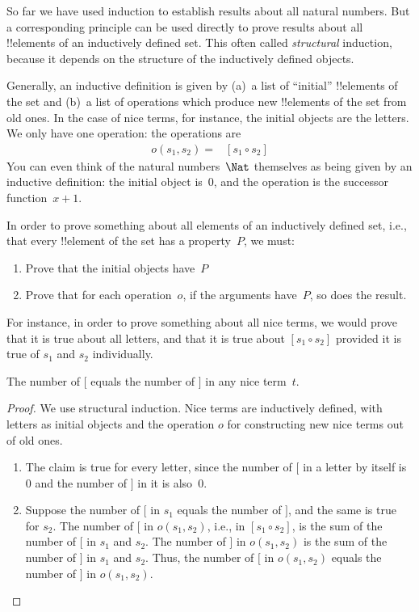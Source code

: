 \documentclass[../../../include/open-logic-section]{subfiles}
\begin{document}


So far we have used induction to establish results about all natural
numbers. But a corresponding principle can be used directly to prove
results about all !!{element}s of an inductively defined set.  This
often called \emph{structural} induction, because it depends on the
structure of the inductively defined objects.

Generally, an inductive definition is given by (a)~a list of
``initial'' !!{element}s of the set and (b)~a list of operations which
produce new !!{element}s of the set from old ones. In the case of nice
terms, for instance, the initial objects are the letters. We only have
one operation: the operations are
\begin{align*}
  o(s_1, s_2) = & [s_1 \circ s_2]
\end{align*}
You can even think of the natural numbers~$\Nat$ themselves as being
given by an inductive definition: the initial object is~$0$, and the
operation is the successor function~$x + 1$.

In order to prove something about all elements of an inductively
defined set, i.e., that every !!{element} of the set has a
property~$P$, we must:
\begin{enumerate}
\item Prove that the initial objects have~$P$
\item Prove that for each operation~$o$, if the arguments have~$P$,
  so does the result.
\end{enumerate}
For instance, in order to prove something about all nice terms, we
would prove that it is true about all letters, and that it is true
about $[s_1 \circ s_2]$ provided it is true of $s_1$ and $s_2$
individually.

\begin{prop}
  The number of $[$ equals the number of $]$ in any nice term~$t$.
\end{prop}

\begin{proof}
We use structural induction.  Nice terms are inductively defined, with
letters as initial objects and the operation $o$ for constructing new
nice terms out of old ones.
\begin{enumerate}
\item The claim is true for every letter, since the number of $[$ in a
  letter by itself is~$0$ and the number of $]$ in it is also~$0$.
\item Suppose the number of $[$ in $s_1$ equals the number of $]$, and
  the same is true for $s_2$. The number of $[$ in $o(s_1, s_2)$, i.e., in
    $[s_1 \circ s_2]$, is the sum of the number of $[$ in $s_1$ and
      $s_2$. The number of $]$ in $o(s_1, s_2)$ is the sum of the number
    of $]$ in $s_1$ and $s_2$. Thus, the number of $[$ in $o(s_1, s_2)$
    equals the number of $]$ in $o(s_1,s_2)$.
\end{enumerate}
\end{proof}
\end{document}
